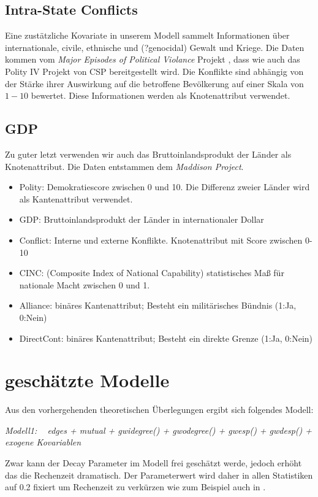 \documentclass[a4paper,ngerman,oneside,titlepage,bibliography=totoc,11pt]{scrreprt}
\begin{document}
\subsection{Intra-State Conflicts}
Eine zustätzliche Kovariate in unserem Modell sammelt Informationen über internationale, civile, ethnische und (?genocidal) Gewalt und Kriege. Die Daten kommen vom \emph{Major Episodes of Political Violance} Projekt \citep{conflict}, dass wie auch das Polity IV Projekt von CSP bereitgestellt wird. Die Konflikte sind abhängig von der Stärke ihrer Auswirkung auf die betroffene Bevölkerung auf einer Skala von $1-10$ bewertet. Diese Informationen werden als Knotenattribut verwendet.

\subsection{GDP}
Zu guter letzt verwenden wir auch das Bruttoinlandsprodukt der Länder als Knotenattribut. Die Daten entstammen dem \emph{Maddison Project}\citep{GDP}. 


\begin{itemize}
  \item Polity: Demokratiescore zwischen 0 und 10. Die Differenz zweier Länder wird als Kantenattribut verwendet.
  \item GDP: Bruttoinlandsprodukt der Länder in internationaler Dollar
  \item Conflict: Interne und externe Konflikte. Knotenattribut mit Score zwischen 0-10
  \item CINC: (Composite Index of National Capability) statistisches Maß für nationale Macht zwischen 0 und 1.
  \item Alliance: binäres Kantenattribut; Besteht ein militärisches Bündnis (1:Ja, 0:Nein)
  \item DirectCont: binäres Kantenattribut; Besteht ein direkte Grenze (1:Ja, 0:Nein)
\end{itemize}

\section{geschätzte Modelle}

Aus den vorhergehenden theoretischen Überlegungen ergibt sich folgendes Modell:

\emph{	Modell1: ~ edges + mutual + gwidegree() + gwodegree() + gwesp() + gwdesp() + exogene Kovariablen}

Zwar kann der Decay Parameter im Modell frei geschätzt werde, jedoch erhöht das die Rechenzeit dramatisch. Der Parameterwert wird daher in allen Statistiken auf 0.2 fixiert  um Rechenzeit zu verkürzen wie zum Beispiel auch in \citet{goodreau2008statnet, pack:ergm, hunter2008goodness, goodreau2007advances}.
\end{document}
